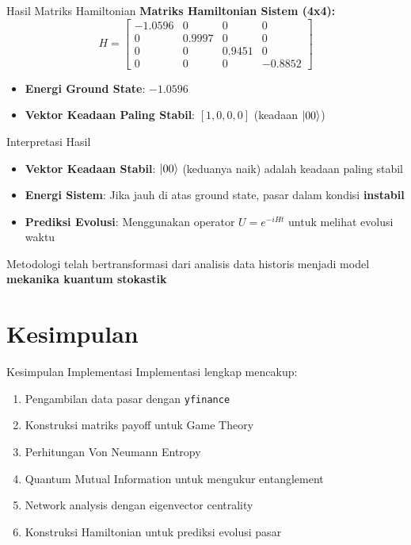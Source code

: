 \documentclass[aspectratio=169]{beamer}
\begin{document}
\begin{frame}{Hasil Matriks Hamiltonian}
    \textbf{Matriks Hamiltonian Sistem (4x4):}
    \begin{equation*}
        H = \begin{bmatrix}
            -1.0596 & 0 & 0 & 0 \\
            0 & 0.9997 & 0 & 0 \\
            0 & 0 & 0.9451 & 0 \\
            0 & 0 & 0 & -0.8852
        \end{bmatrix}
    \end{equation*}
    
    \vspace{0.3cm}
    
    \begin{itemize}
        \item \textbf{Energi Ground State}: $-1.0596$
        \item \textbf{Vektor Keadaan Paling Stabil}: $[1, 0, 0, 0]$ (keadaan $\ket{00}$)
    \end{itemize}
\end{frame}

\begin{frame}{Interpretasi Hasil}
    \begin{itemize}
        \item \textbf{Vektor Keadaan Stabil}: $\ket{00}$ (keduanya naik) adalah keadaan paling stabil
        \item \textbf{Energi Sistem}: Jika jauh di atas ground state, pasar dalam kondisi \textbf{instabil}
        \item \textbf{Prediksi Evolusi}: Menggunakan operator $U = e^{-iHt}$ untuk melihat evolusi waktu
    \end{itemize}
    
    \vspace{0.5cm}
    
    Metodologi telah bertransformasi dari analisis data historis menjadi model \textbf{mekanika kuantum stokastik}
\end{frame}

\section{Kesimpulan}

\begin{frame}{Kesimpulan Implementasi}
    Implementasi lengkap mencakup:
    \begin{enumerate}
        \item Pengambilan data pasar dengan \texttt{yfinance}
        \item Konstruksi matriks payoff untuk Game Theory
        \item Perhitungan Von Neumann Entropy
        \item Quantum Mutual Information untuk mengukur entanglement
        \item Network analysis dengan eigenvector centrality
        \item Konstruksi Hamiltonian untuk prediksi evolusi pasar
    \end{enumerate}
\end{frame}
\end{document}
